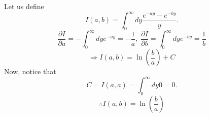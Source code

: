 \item

Let us define
\[
	I(a, b) = \int_0^\infty dy \frac{e^{-ay} - e^{-by}}{y}.
\]
\[
	\frac{\partial I}{\partial a}
	= -\int_0^\infty dy e^{-ay}
	= -\frac{1}{a},\;
	\frac{\partial I}{\partial b}
	= \int_0^\infty dy e^{-by}
	= \frac{1}{b}
\]
\[
	\Rightarrow I(a, b) = \ln \left( \frac{b}{a} \right) + C
\]
Now, notice that
\[
	C
	= I(a, a)
	= \int_0^\infty dy 0
	= 0.
\]
\[
	\therefore I(a, b) = \ln \left( \frac{b}{a} \right)
\]